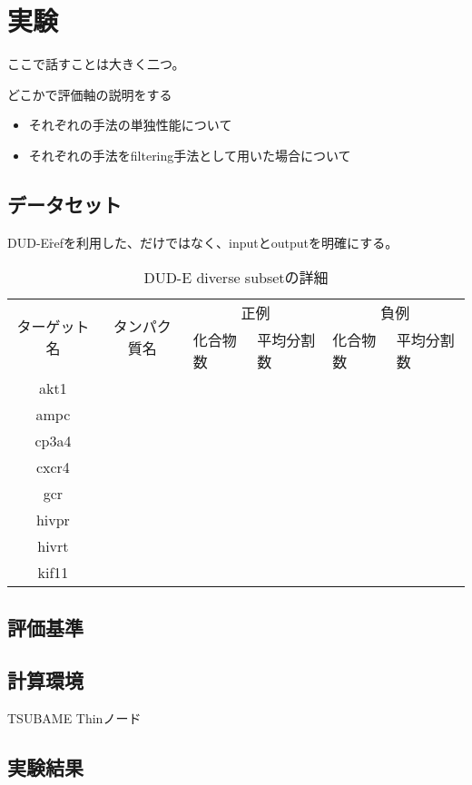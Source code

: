 \chapter{実験}

ここで話すことは大きく二つ。

どこかで評価軸の説明をする
\begin{itemize}
\item それぞれの手法の単独性能について
\item それぞれの手法をfiltering手法として用いた場合について
\end{itemize}
\section{データセット}
DUD-E\r{ref}を利用した、だけではなく、inputとoutputを明確にする。
\begin{table}[htb] \centering
	\caption{DUD-E diverse subsetの詳細}
	\label{tb:dude_divset}
	\begin{tabular}{c|c|ll|ll|}
	\multirow{2}{*}{ターゲット名}	&\multirow{2}{*}{タンパク質名}	&\multicolumn{2}{c}{正例}	&\multicolumn{2}{c}{負例}	\\
							&							&化合物数	&平均分割数	&化合物数	&平均分割数	\\ \hline
	akt1						&							&			&			&			&			\\
	ampc					&							&			&			&			&			\\
	cp3a4					&							&			&			&			&			\\
	cxcr4					&							&			&			&			&			\\
	gcr						&							&			&			&			&			\\
	hivpr					&							&			&			&			&			\\
	hivrt						&							&			&			&			&			\\
	kif11						&							&			&			&			&			\\ \hline
	\end{tabular}
\end{table}
\section{評価基準}
\section{計算環境}
TSUBAME Thinノード
\section{実験結果}
